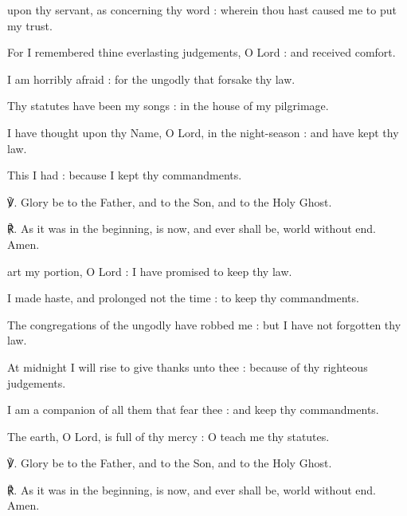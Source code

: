 \begin{multicols}{2}
 upon thy servant, as concerning thy word : wherein thou hast caused me to put my trust.\par
{}
For I remembered thine everlasting judgements, O Lord : and received comfort.\par
{}I am horribly afraid : for the ungodly that forsake thy law.\par
{}Thy statutes have been my songs : in the house of my pilgrimage.\par
{}I have thought upon thy Name, O Lord, in the night-season : and have kept thy law.\par
{}This I had : because I kept thy commandments.\par
℣. Glory be to the Father, and to the Son, and to the Holy Ghost.\par
℟. As it was in the beginning, is now, and ever shall be, world without end. Amen.

 art my portion, O Lord : I have promised to keep thy law.\par
{}
I made haste, and prolonged not the time : to keep thy commandments.\par
{}The congregations of the ungodly have robbed me : but I have not forgotten thy law.\par
{}At midnight I will rise to give thanks unto thee : because of thy righteous judgements.\par
{}I am a companion of all them that fear thee : and keep thy commandments.\par
{}The earth, O Lord, is full of thy mercy : O teach me thy statutes.\par
℣. Glory be to the Father, and to the Son, and to the Holy Ghost.\par
℟. As it was in the beginning, is now, and ever shall be, world without end. Amen.


\end{multicols}

